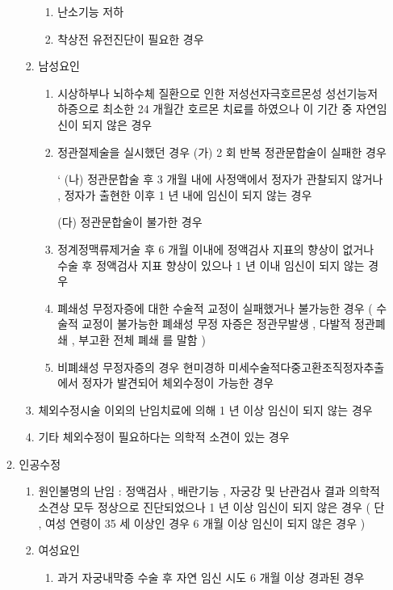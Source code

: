 \begin{enumerate}[가.]
\begin{enumerate}[1)]
\begin{enumerate}[가)]
\begin{enumerate}[(1)]
			\item 난소기능 저하  
			\item 착상전 유전진단이 필요한 경우  
			\end{enumerate}
		\item 남성요인 
			\begin{enumerate}[(1)]\tightlist
			\item 시상하부나 뇌하수체 질환으로 인한 저성선자극호르몬성  성선기능저하증으로 최소한  24 개월간 호르몬 치료를 하였으나 이 기간 중 자연임신이 되지 않은 경우 
			\item 정관절제술을 실시했던 경우 \newline
				(가) 2 회 반복 정관문합술이 실패한 경우 \par` 
				(나) 정관문합술 후  3 개월 내에 사정액에서 정자가 관찰되지 않거나 ,  정자가 출현한 이후  1 년 내에 임신이  되지 않는 경우 \par 
				(다) 정관문합술이 불가한 경우\par
			\item 정계정맥류제거술 후  6 개월 이내에 정액검사 지표의  향상이 없거나 수술 후 정액검사 지표 향상이 있으나  1 년 이내 임신이 되지 않는 경우 
			\item 폐쇄성 무정자증에 대한 수술적 교정이 실패했거나 불가능한 경우 ( 수술적 교정이 불가능한 폐쇄성 무정 자증은 정관무발생 ,  다발적 정관폐쇄 ,  부고환 전체 폐쇄 를 말함 ) 
			\item 비폐쇄성 무정자증의 경우 현미경하 미세수술적다중고환조직정자추출에서 정자가 발견되어 체외수정이 가능한 경우 
			\end{enumerate}
		\item 체외수정시술 이외의 난임치료에 의해  1 년 이상 임신이 되지 않는 경우 
		\item 기타 체외수정이 필요하다는 의학적 소견이 있는 경우 
		\end{enumerate}
 	\item 인공수정  
		\begin{enumerate}[가)]\tightlist
		\item 원인불명의 난임 :  정액검사 ,  배란기능 ,  자궁강 및 난관검사 결과 의학적 소견상 모두 정상으로 진단되었으나  1 년 이상 임신이  되지 않은 경우 ( 단 ,  여성 연령이  35 세 이상인 경우  6 개월  이상 임신이 되지 않은 경우 ) 
		\item 여성요인 
			\begin{enumerate}[(1)]\tightlist
			\item 과거 자궁내막증 수술 후 자연 임신 시도  6 개월 이상 경과된 경우 

\end{enumerate}
\end{enumerate}
\end{enumerate}
\end{enumerate}
